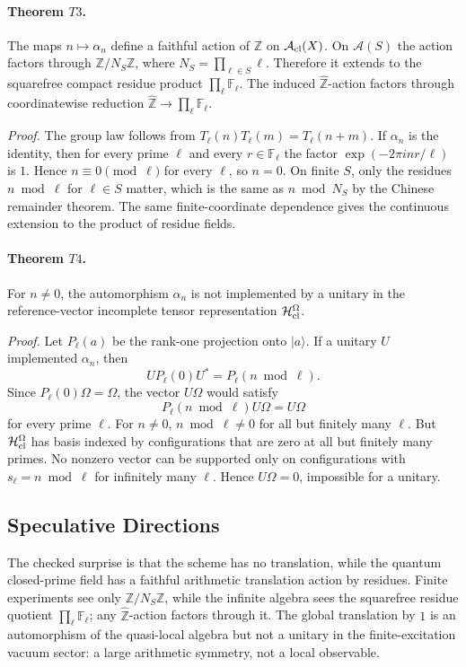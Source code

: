 \paragraph{Theorem \(T3\).}
The maps \(n\mapsto\alpha_n\) define a faithful action of \(\mathbb Z\) on
\(\mathcal A_{\rm cl}(X)\).  On \(\mathcal A(S)\) the action factors through
\(\mathbb Z/N_S\mathbb Z\), where \(N_S=\prod_{\ell\in S}\ell\).  Therefore it
extends to the squarefree compact residue product \(\prod_\ell\mathbb F_\ell\).
The induced \(\widehat{\mathbb Z}\)-action factors through coordinatewise
reduction \(\widehat{\mathbb Z}\to\prod_\ell\mathbb F_\ell\).

\emph{Proof.}
The group law follows from \(T_\ell(n)T_\ell(m)=T_\ell(n+m)\).  If
\(\alpha_n\) is the identity, then for every prime \(\ell\) and every
\(r\in\mathbb F_\ell\) the factor \(\exp(-2\pi i nr/\ell)\) is \(1\).  Hence
\(n\equiv0\pmod\ell\) for every \(\ell\), so \(n=0\).  On finite \(S\), only
the residues \(n\bmod\ell\) for \(\ell\in S\) matter, which is the same as
\(n\bmod N_S\) by the Chinese remainder theorem.  The same finite-coordinate
dependence gives the continuous extension to the product of residue fields.

\paragraph{Theorem \(T4\).}
For \(n\ne0\), the automorphism \(\alpha_n\) is not implemented by a unitary in
the reference-vector incomplete tensor representation
\(\mathcal H^\Omega_{\rm cl}\).

\emph{Proof.}
Let \(P_\ell(a)\) be the rank-one projection onto \(|a\rangle\).  If a unitary
\(U\) implemented \(\alpha_n\), then
\[
  U P_\ell(0) U^*=P_\ell(n\bmod\ell).
\]
Since \(P_\ell(0)\Omega=\Omega\), the vector \(U\Omega\) would satisfy
\[
  P_\ell(n\bmod\ell)U\Omega=U\Omega
\]
for every prime \(\ell\).  For \(n\ne0\), \(n\bmod\ell\ne0\) for all but
finitely many \(\ell\).  But \(\mathcal H^\Omega_{\rm cl}\) has basis indexed
by configurations that are zero at all but finitely many primes.  No nonzero
vector can be supported only on configurations with \(s_\ell=n\bmod\ell\) for
infinitely many \(\ell\).  Hence \(U\Omega=0\), impossible for a unitary.

\subsection{Speculative Directions}
The checked surprise is that the scheme has no translation, while the quantum
closed-prime field has a faithful arithmetic translation action by residues.
Finite experiments see only \(\mathbb Z/N_S\mathbb Z\), while the infinite
algebra sees the squarefree residue quotient \(\prod_\ell\mathbb F_\ell\); any
\(\widehat{\mathbb Z}\)-action factors through it.  The global translation by
\(1\) is an automorphism of the quasi-local algebra but not a unitary in the
finite-excitation vacuum sector: a large arithmetic symmetry, not a local
observable.

